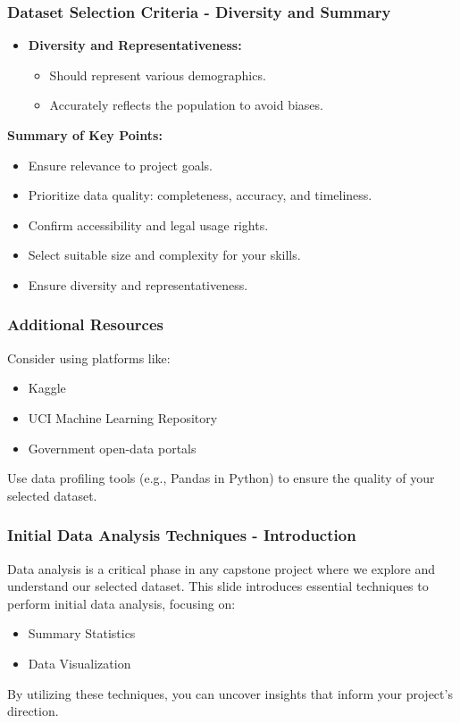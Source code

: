 \documentclass[aspectratio=169]{beamer}
\begin{document}
\begin{frame}[fragile]
    \frametitle{Dataset Selection Criteria - Diversity and Summary}
    \begin{itemize}
        \item \textbf{Diversity and Representativeness:}
        \begin{itemize}
            \item Should represent various demographics.
            \item Accurately reflects the population to avoid biases.
        \end{itemize}
    \end{itemize}
    
    \textbf{Summary of Key Points:}
    \begin{itemize}
        \item Ensure relevance to project goals.
        \item Prioritize data quality: completeness, accuracy, and timeliness.
        \item Confirm accessibility and legal usage rights.
        \item Select suitable size and complexity for your skills.
        \item Ensure diversity and representativeness.
    \end{itemize}
\end{frame}

\begin{frame}[fragile]
    \frametitle{Additional Resources}
    Consider using platforms like:
    \begin{itemize}
        \item Kaggle
        \item UCI Machine Learning Repository
        \item Government open-data portals
    \end{itemize}
    
    Use data profiling tools (e.g., Pandas in Python) to ensure the quality of your selected dataset.
\end{frame}

\begin{frame}[fragile]
    \frametitle{Initial Data Analysis Techniques - Introduction}
    Data analysis is a critical phase in any capstone project where we explore and understand our selected dataset. This slide introduces essential techniques to perform initial data analysis, focusing on:
    
    \begin{itemize}
        \item Summary Statistics
        \item Data Visualization
    \end{itemize}
    
    By utilizing these techniques, you can uncover insights that inform your project's direction.
\end{frame}
\end{document}
